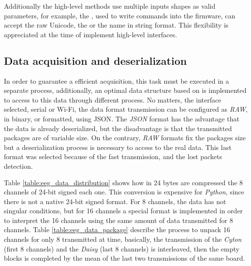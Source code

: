 

Additionally the high-level methods use multiple inputs shapes as valid parameters, for example, the , used to write commands into the firmware, 
can accept the raw Unicode, the  or the name in string format. This flexibility is appreciated at the time of implement high-level interfaces.



\subsection{Data acquisition and deserialization}

In order to guarantee a efficient acquisition, this task must be executed in a separate process, additionally, an optimal data structure based on  is implemented to access to this data through different process. No matters, the interface selected, serial or Wi-Fi, the data format transmission can be configured as \textit{RAW}, in binary, or formatted, using \gls*{JSON}. The \textit{JSON} format has the advantage that the data is already deserialized, but the disadvantage is that the transmitted packages are of variable size. On the contrary, \textit{RAW} formats fix the packages size but a deserialization process is necessary to access to the real data. This last format was selected because of the fast transmission, and the lost packets detection.

Table \ref{table:eeg_data_distribution} shows how in 24 bytes are compressed the 8 channels of 24-bit signed each one. This conversion is expensive for \textit{Python}, since there is not a native 24-bit signed format. For 8 channels, the data has not singular conditions, but for 16 channels a special format is implemented in order to interpret the 16 channels using the same amount of data transmitted for 8 channels. Table \ref{table:eeg_data_package} describe the process to unpack 16 channels for only 8 transmitted at time, basically, the transmission of the \textit{Cyton} (first 8 channels) and the \textit{Daisy} (last 8 channels) is interleaved, then the empty blocks is completed by the mean of the last two transmissions of the same board.





